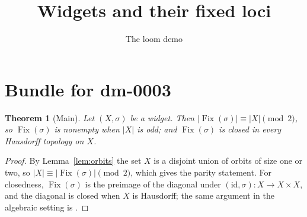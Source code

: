 \documentclass{amsart}
\title{Widgets and their fixed loci}
\author{The loom demo}
\theoremstyle{plain}
\newtheorem{theorem}{Theorem}[section]
\theoremstyle{definition}
\theoremstyle{remark}
\newcommand{\Fix}{\operatorname{Fix}}
\begin{document}
\section*{Bundle for dm-0003}

\begin{theorem}[Main]\label{dm-0003}
Let $(X,\sigma)$ be a widget. Then $|\Fix(\sigma)| \equiv |X| \pmod 2$, so $\Fix(\sigma)$ is nonempty when $|X|$ is odd; and $\Fix(\sigma)$ is closed in every Hausdorff topology on $X$.
\end{theorem}

\begin{proof}
By Lemma~\ref{lem:orbits} the set $X$ is a disjoint union of orbits of size one or two, so $|X| \equiv |\Fix(\sigma)| \pmod 2$, which gives the parity statement. For closedness, $\Fix(\sigma)$ is the preimage of the diagonal under $(\mathrm{id},\sigma)\colon X\to X\times X$, and the diagonal is closed when $X$ is Hausdorff; the same argument in the algebraic setting is \cite[Proposition 3.2]{Man12}.
\end{proof}
\end{document}
